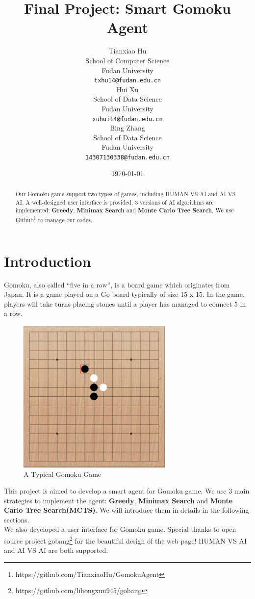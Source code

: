 \documentclass[12pt,a4paper]{article}
\title{Final Project: Smart Gomoku Agent}
\author{Tianxiao Hu \\
  School of Computer Science\\
  Fudan University\\
  {\tt txhu14@fudan.edu.cn} \\\And
  Hui Xu \\
  School of Data Science\\
  Fudan University\\
  {\tt xuhui14@fudan.edu.cn} \\\And
  Bing Zhang \\
  School of Data Science\\
  Fudan University\\
  {\tt 14307130338@fudan.edu.cn}
}
\date{\today}
\begin{document}
\maketitle
\begin{abstract}
Our Gomoku game support two types of games, including HUMAN VS AI and AI VS AI. A well-designed user interface is provided. 3 versions of AI algorithms are implemented: \textbf{Greedy}, \textbf{Minimax Search} and \textbf{Monte Carlo Tree Search}. We use Github\footnote{https://github.com/TianxiaoHu/GomokuAgent} to manage our codes.

\end{abstract}

\section{Introduction}
Gomoku, also called ``five in a row'', is a board game which originates from Japan. It is a game played on a Go board typically of size 15 x 15. In the game, players will take turns placing stones until a player has managed to connect 5 in a row.

\begin{figure}[!ht]
\centering\includegraphics[width=3in]{2.png}
\caption{A Typical Gomoku Game}
\end{figure} 

This project is aimed to develop a smart agent for Gomoku game. We use 3 main strategies to implement the agent: \textbf{Greedy}, \textbf{Minimax Search} and \textbf{Monte Carlo Tree Search(MCTS)}. We will introduce them in details in the following sections.\\
We also developed a user interface for Gomoku game. Special thanks to open source project gobang\footnote{https://github.com/lihongxun945/gobang} for the beautiful design of the web page! HUMAN VS AI and AI VS AI are both supported. 
\end{document}
